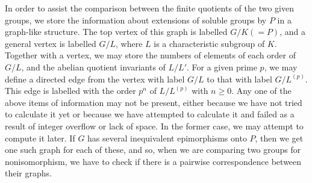 In order to assist the comparison between the finite quotients of
the two given groups, we store the information about extensions of soluble
groups by $P$ in a graph-like structure. The top vertex of this graph is
labelled $G/K  (= P)$, and a general vertex is labelled $G/L$,  where $L$ is
a characteristic subgroup of $K$. Together with a vertex, we may store the
numbers of elements of each order of $G/L$,  and the abelian quotient
invariants of $L/L'$. For a given prime $p$, we may define a directed edge
from the vertex with label $G/L$ to  that with label $G/L^{(p)}$. This edge
is labelled with the order $p^n$ of $L/L^{(p)}$  with $n \geq 0$. Any one of the
above items of information may not be present, either because we have not
tried to calculate it yet or because we have attempted to calculate it and
failed as a result of integer overflow or lack of space. In the former case,
we may attempt to compute it later.  If $G$ has several inequivalent
epimorphisms onto $P$, then we get one such graph for each of these, and so,
when we are comparing two groups for nonisomorphism, we have to check if there
is a pairwise correspondence between their graphs.

